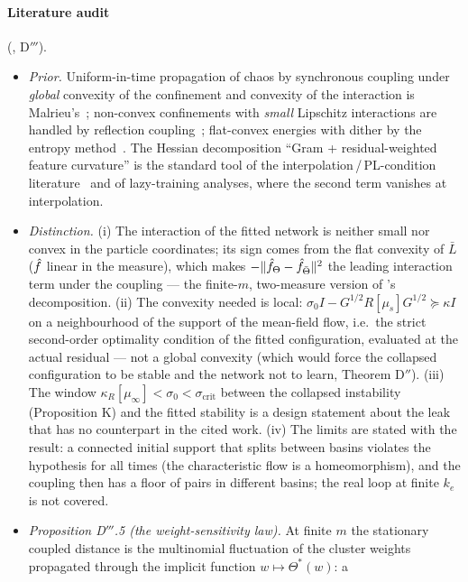 \paragraph{Literature audit} (, D$'''$).
\begin{itemize}
  \item \emph{Prior.} Uniform-in-time propagation of chaos by synchronous coupling under \emph{global} convexity of
    the confinement and convexity of the interaction is Malrieu's~\cite{S37}; non-convex confinements with
    \emph{small} Lipschitz interactions are handled by reflection coupling~\cite{S38}; flat-convex energies with dither
    by the entropy method~\cite{S5}. The Hessian decomposition ``Gram + residual-weighted feature curvature'' is the
    standard tool of the interpolation\,/\,PL-condition literature~\cite{S39} and of lazy-training analyses, where the
    second term vanishes at interpolation.
  \item \emph{Distinction.} (i) The interaction of the fitted network is neither small nor convex in the particle
    coordinates; its sign comes from the flat convexity of $\bar L$ ($\hat f$ linear in the measure), which makes
    $-\lVert \hat f_\Theta - \hat f_{\bar\Theta}\rVert^2$ the leading interaction term under the coupling --- the finite-$m$,
    two-measure version of \cite{S39}'s decomposition. (ii) The convexity needed is local:
    $\sigma_0I - G^{1/2}R[\mu_s]G^{1/2}\succeq\kappa I$ on a neighbourhood of the support of the mean-field flow,
    i.e.\ the strict second-order optimality condition of the fitted configuration, evaluated at the actual residual
    --- not a global convexity (which would force the collapsed configuration to be stable and the network not to
    learn, Theorem D$''$). (iii) The window $\kappa_R[\mu_\infty] < \sigma_0 < \sigma_{\mathrm{crit}}$ between the
    collapsed instability (Proposition K) and the fitted stability is a design statement about the leak that has no
    counterpart in the cited work. (iv) The limits are stated with the result: a connected initial support that splits
    between basins violates the hypothesis for all times (the characteristic flow is a homeomorphism), and the
    coupling then has a floor of pairs in different basins; the real loop at finite $k_e$ is not covered.
  \item \emph{Proposition D$'''$.5 (the weight-sensitivity law).} At finite $m$ the stationary coupled distance is the
    multinomial fluctuation of the cluster weights propagated through the implicit function $w\mapsto\Theta^*(w)$: a

\end{itemize}
